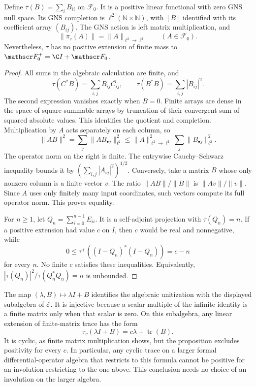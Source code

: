 \begin{proposition}
\label{prop:weil-matrix-trace}
Define $\tau(B)=\sum_i B_{ii}$ on $\mathscr F_0$.
It is a positive linear functional with zero GNS null space.
Its GNS completion is $\ell^2(\mathbb N\times\mathbb N)$, with $[B]$
identified with its coefficient array $(B_{ij})$.
The GNS action is left matrix multiplication, and
\[
 \|\pi_\tau(A)\|=\|A\|_{\ell^2\to\ell^2}
 \qquad(A\in\mathscr F_0).
\]
Nevertheless, $\tau$ has no positive extension of finite mass to
$\mathscr F_0^+=\C I+\mathscr F_0$.
\end{proposition}
\begin{proof}
All sums in the algebraic calculation are finite, and
\[
 \tau(C^*B)=\sum_{i,j}B_{ij}\overline{C_{ij}},\qquad
 \tau(B^*B)=\sum_{i,j}|B_{ij}|^2.
\]
The second expression vanishes exactly when $B=0$.
Finite arrays are dense in the space of square-summable arrays by
truncation of their convergent sum of squared absolute values.
This identifies the quotient and completion.
Multiplication by $A$ acts separately on each column, so
\[
 \|AB\|^2=\sum_j\|A B_{\bullet j}\|_{\ell^2}^2
       \leq\|A\|_{\ell^2\to\ell^2}^2\sum_j\|B_{\bullet j}\|_{\ell^2}^2.
\]
The operator norm on the right is finite.  The entrywise
Cauchy--Schwarz inequality bounds it by
$(\sum_{i,j}|A_{ij}|^2)^{1/2}$.
Conversely, take a matrix $B$ whose only nonzero column is a finite
vector $v$.  The ratio $\|AB\|/\|B\|$ is $\|Av\|/\|v\|$.
Since $A$ uses only finitely many input coordinates, such vectors
compute its full operator norm.  This proves equality.

For $n\geq1$, let $Q_n=\sum_{i=0}^{n-1}E_{ii}$.
It is a self-adjoint projection with $\tau(Q_n)=n$.
If a positive extension had value $c$ on $I$, then $c$ would be real
and nonnegative, while
\[
 0\leq\tau^+((I-Q_n)^*(I-Q_n))=c-n
\]
for every $n$.  No finite $c$ satisfies these inequalities.
Equivalently,
$|\tau(Q_n)|^2/\tau(Q_n^*Q_n)=n$ is unbounded.
\end{proof}

The map $(\lambda,B)\mapsto\lambda I+B$ identifies the algebraic
unitization with the displayed subalgebra of $\mathscr E$.
It is injective because a scalar multiple of the infinite identity is
a finite matrix only when that scalar is zero.
On this subalgebra, any linear extension of finite-matrix trace has the
form
\[
 \tau_c(\lambda I+B)=c\lambda+\operatorname{tr}(B).
\]
It is cyclic, as finite matrix multiplication shows, but the proposition
excludes positivity for every $c$.  In particular, any cyclic trace on
a larger formal differential-operator algebra that restricts to this
formula cannot be positive for an involution restricting to the one above.
This conclusion needs no choice of an involution on the larger algebra.

